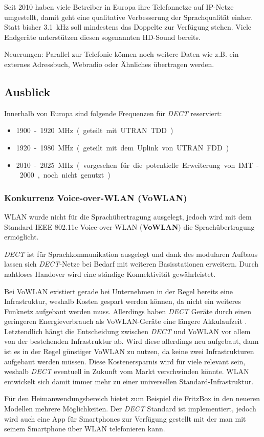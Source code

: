 \begin{multicols}{3}
Seit 2010 haben viele Betreiber in Europa ihre Telefonnetze auf IP-Netze umgestellt, damit geht eine qualitative Verbesserung der Sprachqualität einher. Statt bisher \SI{3.1}{\kilo\hertz} soll mindestens das Doppelte zur Verfügung stehen. Viele Endgeräte unterstützen  diesen sogenannten HD-Sound bereits.

Neuerungen:
Parallel zur Telefonie können noch weitere Daten wie z.B. ein externes Adressbuch, Webradio oder Ähnliches übertragen werden.
\cite{dect.3,dect.5}
\subsection*{Ausblick}
Innerhalb von Europa sind folgende Frequenzen für \textit{DECT} reserviert:
\begin{itemize}
\item \SI{1900}-\SI{1920}{\mega\hertz} (geteilt mit UTRAN TDD)
\item \SI{1920}-\SI{1980}{\mega\hertz} (geteilt mit dem Uplink von UTRAN FDD)
\item \SI{2010}-\SI{2025}{\mega\hertz} (vorgesehen für die potentielle Erweiterung von IMT-2000, noch nicht genutzt)
\end{itemize} 

\subsubsection*{Konkurrenz Voice-over-WLAN (VoWLAN)}
WLAN wurde nicht für die Sprachübertragung ausgelegt, jedoch wird mit dem Standard IEEE 802.11e Voice-over-WLAN (\textbf{VoWLAN}) die Sprachübertragung ermöglicht.

\textit{DECT} ist für Sprachkommunikation ausgelegt und dank des modularen Aufbaus lassen sich \textit{DECT}-Netze bei Bedarf mit weiteren Basisstationen erweitern. Durch nahtloses Handover wird eine ständige Konnektivität gewährleistet.

Bei VoWLAN existiert gerade bei Unternehmen in der Regel bereits eine Infrastruktur, weshalb Kosten gespart werden können, da nicht ein weiteres Funknetz aufgebaut werden muss. Allerdings haben \textit{DECT} Geräte durch einen geringeren Energieverbrauch als VoWLAN-Geräte eine längere Akkulaufzeit .
Letztendlich hängt die Entscheidung zwischen \textit{DECT} und VoWLAN vor allem von der bestehenden Infrastruktur ab. Wird diese allerdings neu aufgebaut, dann ist es in der Regel günstiger VoWLAN zu nutzen, da keine zwei Infrastrukturen aufgebaut werden müssen. Diese Kostenersparnis wird für viele relevant sein, weshalb \textit{DECT} eventuell in Zukunft vom Markt verschwinden könnte. WLAN entwickelt sich damit immer mehr zu einer universellen Standard-Infrastruktur. 

Für den Heimanwendungsbereich bietet zum Beispiel die FritzBox in den neueren Modellen mehrere Möglichkeiten. Der \textit{DECT} Standard ist implementiert, jedoch wird auch eine App für Smartphones zur Verfügung gestellt mit der man mit seinem Smartphone über WLAN telefonieren kann. 
\cite{dect.6,dect.7,dect.8}

\printbibliography[segment=1,heading=subbibliography]
\end{multicols}
\newpage
